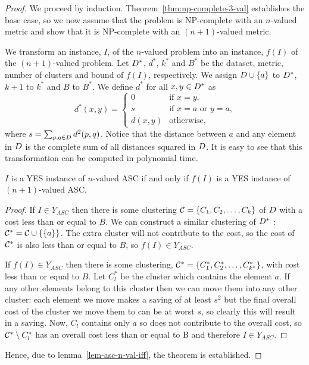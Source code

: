 \begin{proof}
  We proceed by induction.  Theorem~\ref{thm:np-complete-3-val} establishes
  the base case, so we now assume that the problem is NP-complete with an
  $n$-valued metric and show that it is NP-complete with an $(n+1)$-valued
  metric.

  We transform an instance, $I$, of the $n$-valued problem into an instance,
  $f(I)$ of the $(n+1)$-valued problem.  Let $D^*$, $d^*$, $k^*$ and $B^*$
  be the dataset, metric, number of clusters and bound of $f(I)$,
  respectively.  We assign $D \cup \{a\}$ to $D^*$, $k+1$ to $k^*$ and
  $B$ to $B^*$.  We define $d^*$ for all $x,y \in D^*$ as
  \begin{equation*}
    d^*(x,y) =
    \begin{cases}
      0 & \text{if $x=y$,}\\
      s & \text{if $x=a$ or $y=a$,}\\
      d(x,y) & \text{otherwise,}
    \end{cases}
  \end{equation*}
  where $s = \sum_{p,q \in D} d^2(p,q)$.  Notice that the distance between
  $a$ and any element in $D$ is the complete sum of all distances squared
  in $D$.  It is easy to see that this transformation can be computed in
  polynomial time.

  \begin{lem}
    \label{lem-asc-n-val-iff}
    $I$ is a YES instance of $n$-valued ASC if and only if $f(I)$ is a YES
    instance of $(n+1)$-valued ASC.
  \end{lem}
  \begin{proof}
    If $I \in Y_{ASC}$ then there is some clustering $\mathcal{C} =
    \{C_1,C_2,\dotsc,C_k\}$ of $D$ with a cost less than or equal to $B$.
    We can construct a similar clustering of $D^*$ : $\mathcal{C}^* = \mathcal{C} \cup
    \{\{a\}\}$.  The extra cluster will not contribute to the cost, so the
    cost of $\mathcal{C}^*$ is also less than or equal to $B$, so $f(I) \in
    Y_{ASC}$.

    If $f(I) \in Y_{ASC}$ then there is some clustering, $\mathcal{C}^* =
    \{C^*_1,C^*_2,\dotsc, C^*_{k^*}\}$, with cost less than or equal to $B$.
    Let $C^*_l$ be the cluster which contains the element $a$.  If any other
    elements belong to this cluster then we can move them into any other
    cluster: each element we move makes a saving of at least $s^2$ but the
    final overall cost of the cluster we move them to can be at worst $s$, so
    clearly this will result in a saving.  Now, $C_l$ contains only $a$ so
    does not contribute to the overall cost, so $\mathcal{C}^* \setminus C^*_l$ has
    an overall cost less than or equal to B and therefore $I \in Y_{ASC}$.
  \end{proof}

  Hence, due to lemma~\ref{lem-asc-n-val-iff}, the theorem is established.
\end{proof}

